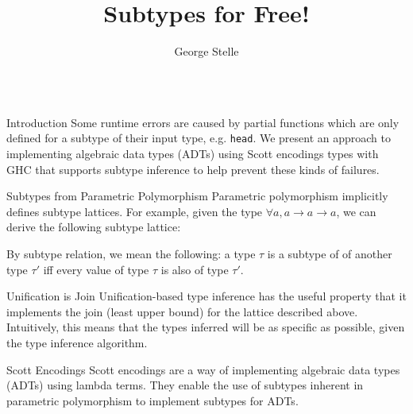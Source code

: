 \documentclass[final]{beamer}
\title{Subtypes for Free!}
\author{George Stelle}
\institute{University of New Mexico}
\begin{document}
\begin{frame}[fragile]
\begin{columns}
\begin{column}{.285\textwidth}

\begin{block}{Introduction}
\vspace{0.5cm}
Some runtime errors are caused by partial functions which are only defined for a
subtype of their input type, e.g. \texttt{head}. We present an approach to
implementing algebraic data types (ADTs) using Scott encodings types with GHC
that supports subtype inference to help prevent these kinds of failures.
\end{block}
\vspace{2cm}
\begin{block}{Subtypes from Parametric Polymorphism}
\vspace{0.5cm}
Parametric polymorphism implicitly defines subtype lattices. For example, given
the type $\forall a, a \rightarrow a \rightarrow a$, we can derive the following
subtype lattice:
\vspace{0.5cm}
\begin{figure}[!h]
\centering
{}
\end{figure}
By subtype relation, we mean the following: a type $\tau$ is a subtype of of
another type $\tau'$ iff every value of type $\tau$ is also of type $\tau'$.
\end{block}
\vspace{2cm}
\begin{block}{Unification is Join}
\vspace{0.5cm}
Unification-based type inference has the useful property that it implements the
join (least upper bound) for the lattice described above. Intuitively, this
means that the types inferred will be as specific as possible, given the type
inference algorithm. 
\end{block}
\vspace{2cm}
\begin{block}{Scott Encodings}
\vspace{0.5cm}
Scott encodings are a way of implementing algebraic data types (ADTs) using
lambda terms. They enable the use of subtypes inherent in parametric
polymorphism to implement subtypes for ADTs. 
\end{block}
\end{column}


\end{columns}
\end{frame}
\end{document}
